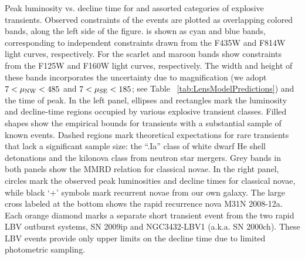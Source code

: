 \label{fig:PeakLuminosityDeclineTime}
Peak luminosity vs. decline time for \spock and assorted categories of
explosive transients.  Observed constraints of the \spock events are
plotted as overlapping colored bands, along the left side of the
figure.  \spockone is shown as cyan and blue bands, corresponding to
independent constraints drawn from the F435W and F814W light curves,
respectively.  For \spocktwo the scarlet and maroon bands show
constraints from the F125W and F160W light curves, respectively.  The
width and height of these bands incorporates the uncertainty due to
magnification (we adopt $7<\mu_{\rm NW}<485$ and $7<\mu_{\rm SE}<185$; see Table ~\ref{tab:LensModelPredictions}) and the time of peak.  In
the left panel, ellipses and rectangles mark the luminosity and
decline-time regions occupied by various explosive transient classes.
Filled shapes show the empirical bounds for transients with a
substantial sample of known events. Dashed regions mark theoretical
expectations for rare transients that lack a significant sample size:
the ``.Ia'' class of white dwarf He shell detonations and the kilonova
class from neutron star mergers.  Grey bands in both panels show the
MMRD relation for classical novae.  In the right panel, circles mark
the observed peak luminosities and decline times for classical novae,
while black `+' symbols mark recurrent novae from our own galaxy.  The
large cross labeled at the bottom shows the rapid recurrence nova M31N
2008-12a.  Each orange diamond marks a separate short transient event
from the two rapid LBV outburst systems, SN
2009ip\cite{Pastorello:2013} and NGC3432-LBV1 (a.k.a. SN
2000ch)\cite{Pastorello:2010}.  These LBV events provide only upper
limits on the decline time due to limited photometric sampling.
